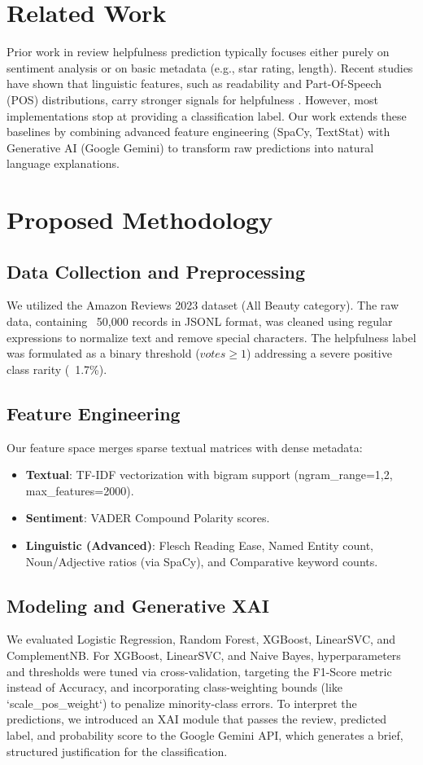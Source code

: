 \documentclass[11pt,a4paper,twoside]{article}
\begin{document}
\section{Related Work}
Prior work in review helpfulness prediction typically focuses either purely on sentiment analysis or on basic metadata (e.g., star rating, length). Recent studies have shown that linguistic features, such as readability and Part-Of-Speech (POS) distributions, carry stronger signals for helpfulness \cite{flesch}. However, most implementations stop at providing a classification label. Our work extends these baselines by combining advanced feature engineering (SpaCy, TextStat) with Generative AI (Google Gemini) to transform raw predictions into natural language explanations.

\section{Proposed Methodology}

\subsection{Data Collection and Preprocessing}
We utilized the Amazon Reviews 2023 dataset (All Beauty category). The raw data, containing ~50,000 records in JSONL format, was cleaned using regular expressions to normalize text and remove special characters. The helpfulness label was formulated as a binary threshold ($votes \geq 1$) addressing a severe positive class rarity (~1.7\%).

\subsection{Feature Engineering}
Our feature space merges sparse textual matrices with dense metadata:
\begin{itemize}
    \item \textbf{Textual}: TF-IDF vectorization with bigram support (ngram\_range=1,2, max\_features=2000).
    \item \textbf{Sentiment}: VADER Compound Polarity scores.
    \item \textbf{Linguistic (Advanced)}: Flesch Reading Ease, Named Entity count, Noun/Adjective ratios (via SpaCy), and Comparative keyword counts.
\end{itemize}

\subsection{Modeling and Generative XAI}
We evaluated Logistic Regression, Random Forest, XGBoost, LinearSVC, and ComplementNB. For XGBoost, LinearSVC, and Naive Bayes, hyperparameters and thresholds were tuned via cross-validation, targeting the F1-Score metric instead of Accuracy, and incorporating class-weighting bounds (like `scale_pos_weight`) to penalize minority-class errors.
To interpret the predictions, we introduced an XAI module that passes the review, predicted label, and probability score to the Google Gemini API, which generates a brief, structured justification for the classification.
\end{document}
